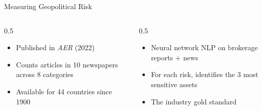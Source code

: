 \documentclass[aspectratio=169]{beamer}
\begin{document}
\begin{frame}{Measuring Geopolitical Risk}
\begin{columns}[T]
\begin{column}{0.5\textwidth}
\begin{shadedbox}[title=\textbf{Caldara-Iacoviello GPR Index}]
\begin{itemize}\footnotesize
  \item Published in \textit{AER} (2022)
  \item Counts articles in 10 newspapers across 8 categories
  \item Available for 44 countries since 1900
\end{itemize}
\end{shadedbox}
\end{column}
\begin{column}{0.5\textwidth}
\begin{shadedbox}[title=\textbf{BlackRock BGRI}]
\begin{itemize}\footnotesize
  \item Neural network NLP on brokerage reports + news
  \item For each risk, identifies the \alert{3 most sensitive assets}
  \item The industry gold standard
\end{itemize}
\end{shadedbox}
\end{column}
\end{columns}
\end{frame}
\end{document}
